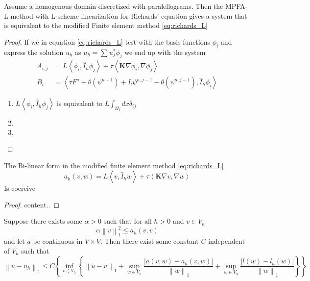 \documentclass[../Main/main.tex]{subfiles}
\begin{document}
	\begin{theorem}
		Assume a homogenous domain discretized with paralellograms.
		Then the MPFA-L method with L-scheme linearization for Richards' equation gives a system that is equivalent to the modified Finite element method \eqref{eq:richards_L}
	\end{theorem}
	\begin{proof}
		If we in equation \eqref{eq:richards_L} test with the basis functions $\phi_i$ and express the solution $u_h$ as $u_h = \sum u_j^* \phi_j $ we end up with the system 
		\begin{equation}
			\begin{aligned}
				A_{i,j} &= L \left \langle \phi_i,\hat{I}_h \phi_j \right \rangle + \tau \left \langle \pmb{K} \nabla \phi_i,\nabla \phi_j \right \rangle \\
				B_i &= \left \langle \tau F^n + \theta(\psi^{n-1})+L\psi^{n,j-1}-\theta(\psi^{n,j-1}),\hat{I}_h \phi_i \right \rangle
			\end{aligned}
		\end{equation}
		
		\begin{enumerate}
			\item $L\left \langle \phi_i,\hat{I}_h \phi_j \right \rangle$ is equivalent to $L\int_{\Omega_i}dx \delta_{ij}$
			\item 
			\item
		\end{enumerate}
	\end{proof}
	\begin{lemma}
		The Bi-linear form in the modified finite element method \eqref{eq:richards_L}
		\begin{equation}
			a_h(v,w) = L\left \langle v,\hat{I}_h w \right \rangle + \tau \left \langle \pmb{K}\nabla v,\nabla w \right \rangle
		\end{equation}
		Is coercive
	\end{lemma}
	\begin{proof}
		content..
	\end{proof}
	\begin{lemma}
		Suppose there exists some $\alpha>0$ such that for all $h>0$ and $v\in V_h$
		\begin{equation*}
			\alpha \left \| v \right \|^2_1 \leq a_h(v,v) 
		\end{equation*}
		and let $a$ be continuous in $V\times V$. Then there exist some constant $C$ independent of $V_h$ such that
		\begin{equation*}
			\left \| u-u_h \right \|_1 \leq C\left \{ \inf_{v \in V_h}\left \{ \left \| u-v \right \|_1 + \sup_{w\in V_h}\frac{|a(v,w)-a_h(v,w)|}{\left \| w \right \|_1}+\sup_{w\in V_h}\frac{|l(w)-l_h(w)|}{\left \| w \right \|_1} \right \} \right \}
		\end{equation*}
	\end{lemma}
\end{document}
